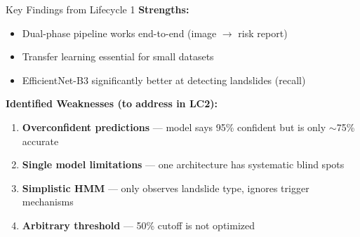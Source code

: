 \documentclass[aspectratio=169]{beamer}
\begin{document}
\begin{frame}{Key Findings from Lifecycle 1}
    \textbf{Strengths:}
    \begin{itemize}
        \item Dual-phase pipeline works end-to-end (image $\to$ risk report)
        \item Transfer learning essential for small datasets
        \item EfficientNet-B3 significantly better at detecting landslides (recall)
    \end{itemize}

    \vspace{0.4cm}
    \textbf{Identified Weaknesses (to address in LC2):}
    \begin{enumerate}
        \item \textbf{Overconfident predictions} --- model says 95\% confident but is only $\sim$75\% accurate
        \item \textbf{Single model limitations} --- one architecture has systematic blind spots
        \item \textbf{Simplistic HMM} --- only observes landslide type, ignores trigger mechanisms
        \item \textbf{Arbitrary threshold} --- 50\% cutoff is not optimized
    \end{enumerate}
\end{frame}
\end{document}
